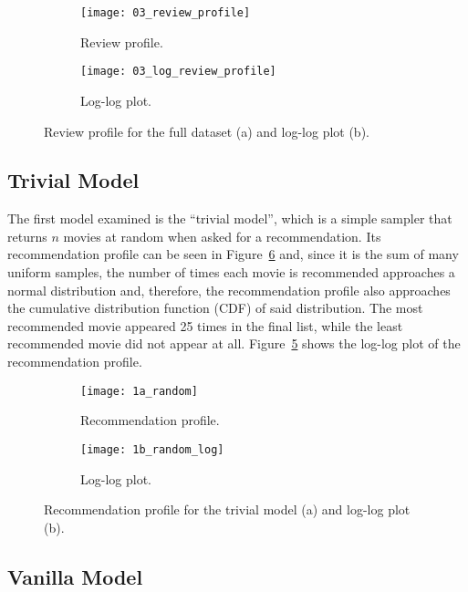 \begin{figure}
  \centering
  \begin{subfigure}{0.45\textwidth}
    \centering
    \texttt{[image: 03\_review\_profile]}
    \caption{Review profile.\label{fig:fig03_review_profile}}
  \end{subfigure}
  \begin{subfigure}{0.45\textwidth}
    \centering
    \texttt{[image: 03\_log\_review\_profile]}
    \caption{Log-log plot.\label{fig:fig03_log_review_profile}}
  \end{subfigure}
  \caption{Review profile for the full dataset (a) and log-log
  plot (b).\label{fig:fig03_review_profile_both}}
\end{figure}

\subsection{Trivial Model}
\label{subsec:trivial}

The first model examined is the ``trivial model'', which is a simple sampler
that returns $n$ movies at random when asked for a recommendation. Its
recommendation profile can be seen in Figure~\ref{fig:fig1} and, since it is the
sum of many uniform samples, the number of times each movie is recommended
approaches a normal distribution and, therefore, the recommendation profile also
approaches the cumulative distribution function (CDF) of said distribution. The
most recommended movie appeared 25 times in the final list, while the least
recommended movie did not appear at all. Figure~\ref{fig:fig1b} shows the
log-log plot of the recommendation profile.

\begin{figure}
  \centering
  \begin{subfigure}{0.45\textwidth}
    \centering
    \texttt{[image: 1a\_random]}
    \caption{Recommendation profile.\label{fig:fig1a}}
  \end{subfigure}
  \begin{subfigure}{0.45\textwidth}
    \centering
    \texttt{[image: 1b\_random\_log]}
    \caption{Log-log plot.\label{fig:fig1b}}
  \end{subfigure}
  \caption{Recommendation profile for the trivial model (a) and log-log plot
    (b).\label{fig:fig1}}
\end{figure}

\subsection{Vanilla Model}
\label{subsec:vanilla}

